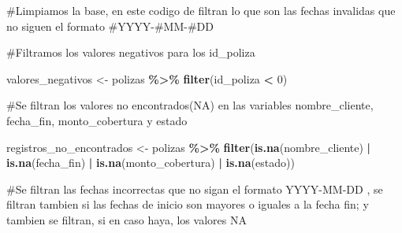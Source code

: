 \documentclass[
]{article}
\newenvironment{Shaded}{\begin{snugshade}}{\end{snugshade}}
\newcommand{\ControlFlowTok}[1]{\textcolor[rgb]{0.13,0.29,0.53}{\textbf{#1}}}
\newcommand{\DecValTok}[1]{\textcolor[rgb]{0.00,0.00,0.81}{#1}}
\newcommand{\FunctionTok}[1]{\textcolor[rgb]{0.13,0.29,0.53}{\textbf{#1}}}
\newcommand{\NormalTok}[1]{#1}
\newcommand{\OtherTok}[1]{\textcolor[rgb]{0.56,0.35,0.01}{#1}}
\newcommand{\SpecialCharTok}[1]{\textcolor[rgb]{0.81,0.36,0.00}{\textbf{#1}}}
\newcommand{\StringTok}[1]{\textcolor[rgb]{0.31,0.60,0.02}{#1}}
\begin{document}
\#Limpiamos la base, en este codigo de filtran lo que son las fechas
invalidas que no siguen el formato \#YYYY-\#MM-\#DD

\begin{Shaded}
\end{Shaded}

\#Filtramos los valores negativos para los id\_poliza

\begin{Shaded}
\begin{Highlighting}[]
\NormalTok{valores\_negativos }\OtherTok{\textless{}{-}}\NormalTok{ polizas }\SpecialCharTok{\%\textgreater{}\%}
  \FunctionTok{filter}\NormalTok{(id\_poliza }\SpecialCharTok{\textless{}} \DecValTok{0}\NormalTok{)}
\end{Highlighting}
\end{Shaded}

\#Se filtran los valores no encontrados(NA) en las variables
nombre\_cliente, fecha\_fin, monto\_cobertura y estado

\begin{Shaded}
\begin{Highlighting}[]
\NormalTok{registros\_no\_encontrados }\OtherTok{\textless{}{-}}\NormalTok{ polizas }\SpecialCharTok{\%\textgreater{}\%}
  \FunctionTok{filter}\NormalTok{(}\FunctionTok{is.na}\NormalTok{(nombre\_cliente) }\SpecialCharTok{|}
           \FunctionTok{is.na}\NormalTok{(fecha\_fin) }\SpecialCharTok{|}
           \FunctionTok{is.na}\NormalTok{(monto\_cobertura) }\SpecialCharTok{|}
           \FunctionTok{is.na}\NormalTok{(estado))}
\end{Highlighting}
\end{Shaded}

\#Se filtran las fechas incorrectas que no sigan el formato YYYY-MM-DD ,
se filtran tambien si las fechas de inicio son mayores o iguales a la
fecha fin; y tambien se filtran, si en caso haya, los valores NA
\end{document}
